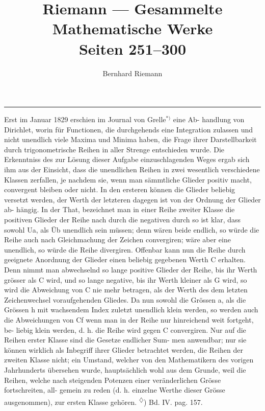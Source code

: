 \documentclass[11pt,a4paper]{article}
\title{\vspace{-1cm}\textbf{Riemann --- Gesammelte Mathematische Werke}\\[0.3em]
\Large Seiten 251--300}
\author{Bernhard Riemann}
\date{}
\begin{document}
\maketitle
\thispagestyle{fancy}
\vspace{-0.5cm}
\hrule
\vspace{0.8cm}







Erst  im  Januar  1829  erschien  im  Journal  von  Grelle$^{*)}$  eine  Ab-
handlung von  Dirichlet,  worin  für  Functionen,  die  durchgehends  eine
Integration  zulassen  und  nicht  unendlich  viele  Maxima  und  Minima
haben,  die  Frage  ihrer  Darstellbarkeit  durch  trigonometrische  Reihen
in  aller  Strenge  entschieden  wurde.
Die  Erkenntniss  des  zur  Lösung  dieser  Aufgabe  einzuschlagenden
Weges  ergab  sich  ihm  aus  der  Einsicht,  dass  die  unendlichen  Reihen
in  zwei  wesentlich  verschiedene  Klassen  zerfallen,  je  nachdem  sie,
wenn  man  sämmtliche  Glieder  positiv  macht,  convergent  bleiben  oder
nicht.  In  den  ersteren  können  die  Glieder  beliebig  versetzt  werden,
der  Werth  der  letzteren  dagegen  ist  von  der  Ordnung  der  Glieder  ab-
hängig. In  der  That,  bezeichnet  man  in  einer  Reihe  zweiter  Klasse
die  positiven  Glieder  der  Reihe  nach  durch
die  negativen  durch
so  ist  klar,  dass  sowohl  Ua,  als  Üb  unendlich  sein  müssen;  denn
wären  beide  endlich,  so  würde  die  Reihe  auch  nach  Gleichmachung
der  Zeichen  convergiren;  wäre  aber  eine  unendlich,  so  würde  die  Reihe
divergiren.  Offenbar  kann  nun  die  Reihe  durch  geeignete  Anordnung
der  Glieder  einen  beliebig  gegebenen  Werth  C  erhalten.  Denn  nimmt
man  abwechselnd  so  lange  positive  Glieder  der  Reihe,  bis  ihr  Werth
grösser  als  C  wird,  und  so  lange  negative,  bis  ihr  Werth  kleiner  als
G  wird,  so  wird  die  Abweichung  von  C  nie  mehr  betragen,  als  der
Werth  des  dem  letzten  Zeichenwechsel  voraufgehenden  Gliedes.  Da
nun  sowohl  die  Grössen  a,  als  die  Grössen  h  mit  wachsendem  Index
zuletzt  unendlich  klein  werden,  so  werden  auch  die  Abweichungen
von  Cf  wenn  man  in  der  Reihe  nur  hinreichend  weit  fortgeht,  be-
liebig klein  werden,  d.  h.  die  Reihe  wird  gegen  C  convergiren.
Nur  auf  die  Reihen  erster  Klasse  sind  die  Gesetze  endlicher  Sum-
men anwendbar;  nur  sie  können  wirklich  als  Inbegriff  ihrer  Glieder
betrachtet  werden,  die  Reihen  der  zweiten  Klasse  nicht;  ein  Umstand,
welcher  von  den  Mathematikern  des  vorigen  Jahrhunderts  übersehen
wurde,  hauptsächlich  wohl  aus  dem  Grunde,  weil  die  Reihen,  welche
nach  steigenden  Potenzen  einer  veränderlichen  Grösse  fortschreiten,  all-
gemein zu  reden  (d.  h.  einzelne  Werthe  dieser  Grösse  ausgenommen),
zur  ersten  Klasse  gehören.
\textsuperscript{$\diamondsuit$})  Bd.  IV.  pag.  157.
\newpage
\end{document}
